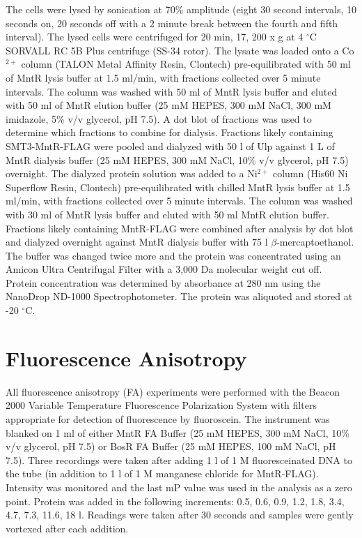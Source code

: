 \documentclass[12pt,twoside]{reedthesis}
\begin{document}
The cells were lysed by sonication at 70\% amplitude (eight 30 second intervals, 10 seconds on, 20 seconds off with a 2 minute break between the fourth and fifth interval). The lysed cells were centrifuged for 20 min, 17, 200 x g at 4 $^\circ$C SORVALL\textsuperscript{\textregistered} RC 5B Plus centrifuge (SS-34 rotor). The lysate was loaded onto a Co$^{2+}$ column (TALON\textsuperscript{\textregistered} Metal Affinity Resin, Clontech) pre-equilibrated with 50 ml of MntR lysis buffer at 1.5 ml/min, with fractions collected over 5 minute intervals. The column was washed with 50 ml of MntR lysis buffer and eluted with 50 ml of MntR elution buffer (25 mM HEPES, 300 mM NaCl, 300 mM imidazole, 5\% v/v glycerol, pH 7.5). A dot blot of fractions was used to determine which fractions to combine for dialysis. Fractions likely containing SMT3-MntR-FLAG were pooled and dialyzed with 50 \micro l of Ulp against 1 L of MntR dialysis buffer (25 mM HEPES, 300 mM NaCl, 10\% v/v glycerol, pH 7.5) overnight. The dialyzed protein solution was added to a Ni$^{2+}$ column (His60 Ni Superflow Resin, Clontech) pre-equilibrated with chilled MntR lysis buffer at 1.5 ml/min, with fractions collected over 5 minute intervals. The column was washed with 30 ml of MntR lysis buffer and eluted with 50 ml MntR elution buffer. Fractions likely containing MntR-FLAG were combined after analysis by dot blot and dialyzed overnight against MntR dialysis buffer with 75 \micro l $\beta$-mercaptoethanol. The buffer was changed twice more and the protein was concentrated using an Amicon\textsuperscript{\textregistered} Ultra Centrifugal Filter with a 3,000 Da molecular weight cut off. Protein concentration was determined by absorbance at 280 nm using the NanoDrop\textsuperscript{\textregistered} ND-1000 Spectrophotometer. The protein was aliquoted and stored at -20 $^{\circ}$C. 


   \section{Fluorescence Anisotropy}
   All fluorescence anisotropy (FA) experiments were performed with the Beacon\textsuperscript{\textregistered} 2000 Variable Temperature Fluorescence Polarization System with filters appropriate for detection of fluorescence by fluoroscein.  The instrument was blanked on 1 ml of either MntR FA Buffer (25 mM HEPES, 300 mM NaCl, 10\% v/v glycerol, pH 7.5) or BosR FA Buffer (25 mM HEPES, 100 mM NaCl, pH 7.5). Three recordings were taken after adding 1 \micro l of 1 \micro M fluoresceinated DNA to the tube (in addition to 1 \micro l of 1 M manganese chloride for MntR-FLAG). Intensity was monitored and the last mP value was used in the analysis as a zero point. Protein was added in the following increments: 0.5, 0.6, 0.9, 1.2, 1.8, 3.4, 4.7, 7.3, 11.6, 18 \micro l. Readings were taken after 30 seconds and samples were gently vortexed after each addition.  
   
\end{document}
